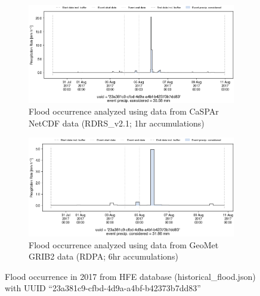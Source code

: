 \documentclass[10pt,a4paper,titlepage,parskip]{scrartcl}
\begin{document}
\begin{figure}[h]
	\begin{subfigure}[a]{1.0\textwidth}
		\centering
		\includegraphics[width=\linewidth]{figures/compare_Geomet_CaSPAr/interpolated_at_stations_occurrence_1756_identified-timesteps_RDRS_v2.1.png}
		\caption{Flood occurrence analyzed using data from CaSPAr NetCDF data (RDRS\_v2.1; 1hr accumulations)}
	\end{subfigure}
	\par\bigskip\bigskip
	\begin{subfigure}[b]{1.0\textwidth}
		\centering
		\includegraphics[width=\linewidth]{figures/compare_Geomet_CaSPAr/interpolated_at_stations_occurrence_1756_identified-timesteps_rdpa:10km:6f.png}
		\caption{Flood occurrence analyzed using data from GeoMet GRIB2 data (RDPA; 6hr accumulations)}
	\end{subfigure}
	\par\bigskip\bigskip
	\caption{Flood occurrence in 2017 from HFE database (historical\_flood.json) with UUID ``23a381c9-cfbd-4d9a-a4bf-b42373b7dd83''}
\end{figure}
\pagebreak
\end{document}
